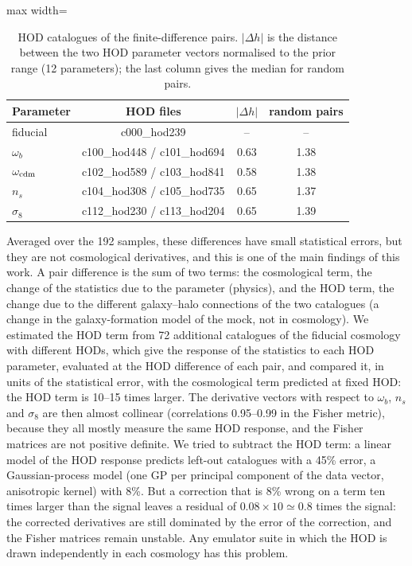 \begin{table}[!htbp]
\centering\small
\begin{adjustbox}{max width=\linewidth}
\begin{tabular}{lccc}
\toprule
Parameter & HOD files & $|\Delta h|$ & random pairs \\
\midrule
fiducial & c000\_hod239 & -- & -- \\
$\omega_b$ & c100\_hod448 / c101\_hod694 & 0.63 & 1.38 \\
$\omega_{\rm cdm}$ & c102\_hod589 / c103\_hod841 & 0.58 & 1.38 \\
$n_s$ & c104\_hod308 / c105\_hod735 & 0.65 & 1.37 \\
$\sigma_8$ & c112\_hod230 / c113\_hod204 & 0.65 & 1.39 \\
\bottomrule
\end{tabular}
\end{adjustbox}
\caption{HOD catalogues of the finite-difference pairs. $|\Delta h|$ is the distance between the two HOD parameter vectors normalised to the prior range (12 parameters); the last column gives the median for random pairs.}
\label{tab:hods}
\end{table}

Averaged over the 192 samples, these differences have small statistical errors, but they are not cosmological derivatives, and this is one of the main findings of this work. A pair difference is the sum of two terms: the cosmological term, the change of the statistics due to the parameter (physics), and the HOD term, the change due to the different galaxy--halo connections of the two catalogues (a change in the galaxy-formation model of the mock, not in cosmology). We estimated the HOD term from 72 additional catalogues of the fiducial cosmology with different HODs, which give the response of the statistics to each HOD parameter, evaluated at the HOD difference of each pair, and compared it, in units of the statistical error, with the cosmological term predicted at fixed HOD: the HOD term is 10--15 times larger. The derivative vectors with respect to $\omega_b$, $n_s$ and $\sigma_8$ are then almost collinear (correlations 0.95--0.99 in the Fisher metric), because they all mostly measure the same HOD response, and the Fisher matrices are not positive definite. We tried to subtract the HOD term: a linear model of the HOD response predicts left-out catalogues with a 45\% error, a Gaussian-process model (one GP per principal component of the data vector, anisotropic kernel) with 8\%. But a correction that is 8\% wrong on a term ten times larger than the signal leaves a residual of $0.08\times10\simeq0.8$ times the signal: the corrected derivatives are still dominated by the error of the correction, and the Fisher matrices remain unstable. Any emulator suite in which the HOD is drawn independently in each cosmology has this problem.

